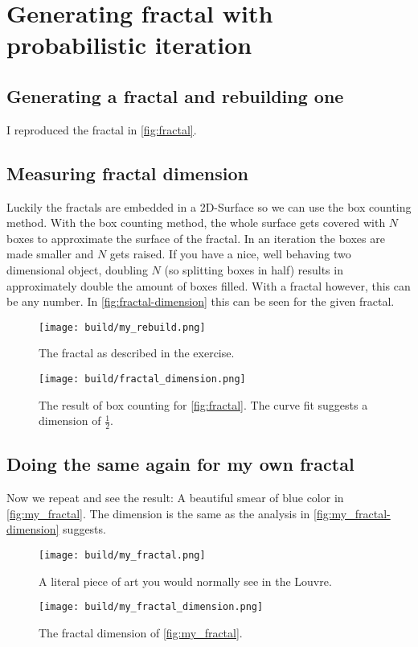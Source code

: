 \section{Generating fractal with probabilistic iteration}
\label{sec:exercise-2}

\subsection{Generating a fractal and rebuilding one}
I reproduced the fractal in \autoref{fig:fractal}.

\subsection{Measuring fractal dimension}
Luckily the fractals are embedded in a 2D-Surface so we can use the box counting method. With the box counting method,
the whole surface gets covered with $N$ boxes to approximate the surface of the fractal. In an iteration the boxes are
made smaller and $N$ gets raised. If you have a nice, well behaving two dimensional object, doubling $N$ (so splitting
boxes in half) results in approximately double the amount of boxes filled. With a fractal however, this can be any
number. In \autoref{fig:fractal-dimension} this can be seen for the given fractal.

\begin{figure}
	\centering
  \texttt{[image: build/my\_rebuild.png]}
  \caption{The fractal as described in the exercise.}
  \label{fig:fractal}
\end{figure}
\begin{figure}
	\centering
  \texttt{[image: build/fractal\_dimension.png]}
  \caption{The result of box counting for \autoref{fig:fractal}. The curve fit suggests a dimension of $\frac12$.}
  \label{fig:fractal-dimension}
\end{figure}

\subsection{Doing the same again for my own fractal}
Now we repeat and see the result: A beautiful smear of blue color in \autoref{fig:my_fractal}. The dimension is the
same as the analysis in \autoref{fig:my_fractal-dimension} suggests.

\begin{figure}
	\centering
  \texttt{[image: build/my\_fractal.png]}
  \caption{A literal piece of art you would normally see in the Louvre.}
  \label{fig:my_fractal}
\end{figure}
\begin{figure}
	\centering
  \texttt{[image: build/my\_fractal\_dimension.png]}
  \caption{The fractal dimension of \autoref{fig:my_fractal}.}
  \label{fig:my_fractal-dimension}
\end{figure}
